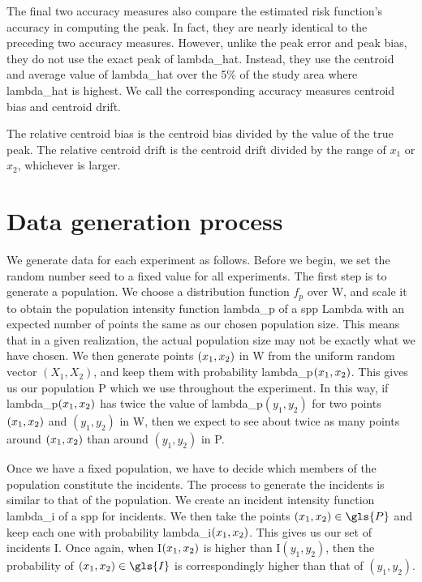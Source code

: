 The final two accuracy measures also compare the estimated risk function's accuracy in computing the peak.
In fact, they are nearly identical to the preceding two accuracy measures.
However, unlike the \gls{peak error} and \gls{peak bias}, they do not use the exact peak of \gls{lambda_hat}.
Instead, they use the centroid and average value of \gls{lambda_hat} over the 5\% of the study area where \gls{lambda_hat} is highest.
We call the corresponding accuracy measures \gls{centroid bias} and \gls{centroid drift}.

The \gls{relative centroid bias} is the \gls{centroid bias} divided by the value of the true peak.
The \gls{relative centroid drift} is the \gls{centroid drift} divided by the range of $x_1$ or $x_2$, whichever is larger.

\section{Data generation process}
\label{sec:method:data generation}

We generate data for each experiment as follows.
Before we begin, we set the random number seed to a fixed value for all experiments.
The first step is to generate a population.
We choose a distribution function $f_p$ over \gls{W}, and scale it to obtain the population intensity function \gls{lambda_p} of a \gls{spp} \gls{Lambda} with an expected number of points the same as our chosen population size.
This means that in a given realization, the actual population size may not be exactly what we have chosen.
We then generate points $(x_1, x_2)$ in \gls{W} from the uniform random vector $(X_1,X_2)$,
and keep them with probability \gls{lambda_p}$(x_1, x_2)$.
This gives us our population \gls{P} which we use throughout the experiment.
In this way,
if \gls{lambda_p}$(x_1, x_2)$ has twice the value of \gls{lambda_p}$(y_1, y_2)$ for two points $(x_1, x_2)$ and $(y_1, y_2)$ in \gls{W},
then we expect to see about twice as many points around $(x_1, x_2)$ than around $(y_1, y_2)$ in \gls{P}.

Once we have a fixed population, we have to decide which members of the population constitute the incidents.
The process to generate the incidents is similar to that of the population.
We create an incident intensity function \gls{lambda_i} of a \gls{spp} for incidents.
We then take the points $\xvec \in \gls{P}$ and keep each one with probability \gls{lambda_i}$(x_1, x_2)$.
This gives us our set of incidents \gls{I}.
Once again, when \gls{I}$(x_1, x_2)$ is higher than \gls{I}$(y_1, y_2)$,
then the probability of $\xvec \in \gls{I}$ is correspondingly higher than that of $(y_1, y_2)$.

